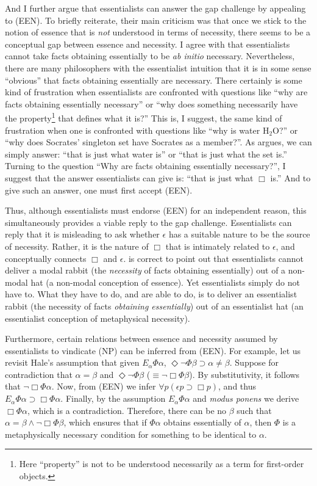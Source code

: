 \documentclass[12pt]{article}
\begin{document}
And I further argue that essentialists can answer the gap challenge by appealing to (EEN). To briefly reiterate, their main criticism was that once we stick to the notion of essence that is \textit{not} understood in terms of necessity, there seems to be a conceptual gap between essence and necessity. I agree with \citet{Romero2019-ROMMIN} that essentialists cannot take facts obtaining essentially to be \textit{ab initio} necessary. Nevertheless, there are many philosophers with the essentialist intuition that it is in some sense ``obvious'' that facts obtaining essentially are necessary. There certainly is some kind of frustration when essentialists are confronted with questions like ``why are facts obtaining essentially necessary'' or ``why does something necessarily have the property\footnote{Here ``property'' is not to be understood necessarily as a term for first-order objects.} that defines what it is?'' This is, I suggest, the same kind of frustration when one is confronted with questions like ``why is water $\text{H}_2 \text{O}$?'' or ``why does Socrates' singleton set have Socrates as a member?''. As \citet{Glazier2017-GLAEE-2} argues, we can simply answer: ``that is just what water is'' or ``that is just what the set is.'' Turning to the question ``Why are facts obtaining essentially necessary?'', I suggest that the answer essentialists can give is: ``that is just what $\Box$ is.'' And to give such an answer, one must first accept (EEN). 
\par
Thus, although essentialists must endorse (EEN) for an independent reason, this simultaneously provides a viable reply to the gap challenge. Essentialists can reply that it is misleading to ask whether $\epsilon$ has a suitable nature to be the source of necessity. Rather, it is the nature of $\Box$ that is intimately related to $\epsilon$, and conceptually connects $\Box$ and $\epsilon$. \citet{Mackie2020-MACMBE} is correct to point out that essentialists cannot deliver a modal rabbit (the \textit{necessity} of facts obtaining essentially) out of a non-modal hat (a non-modal conception of essence). Yet essentialists simply do not have to. What they have to do, and are able to do, is to deliver an essentialist rabbit (the necessity of facts \textit{obtaining essentially}) out of an essentialist hat (an essentialist conception of metaphysical necessity). 
\par
Furthermore, certain relations between essence and necessity assumed by essentialists to vindicate (NP) can be inferred from (EEN). For example, let us revisit Hale's assumption that given $E_\alpha \Phi \alpha$, $\Diamond \lnot \Phi \beta \supset \alpha \neq \beta$. Suppose for contradiction that $\alpha = \beta$ and $\Diamond \lnot \Phi \beta$ ($\equiv \lnot \Box \Phi \beta$). By substitutivity, it follows that $\lnot \Box \Phi \alpha$. Now, from (EEN) we infer $\forall p (\epsilon p \supset \Box p)$, and thus $E_\alpha \Phi \alpha \supset \Box \Phi \alpha$. Finally, by the assumption $E_\alpha \Phi \alpha$ and \textit{modus ponens} we derive $\Box \Phi \alpha$, which is a contradiction. Therefore, there can be no $\beta$ such that $\alpha = \beta \land \lnot \Box \Phi \beta$, which ensures that if $\Phi \alpha$ obtains essentially of $\alpha$, then $\Phi$ is a metaphysically necessary condition for something to be identical to $\alpha$. 
\end{document}
